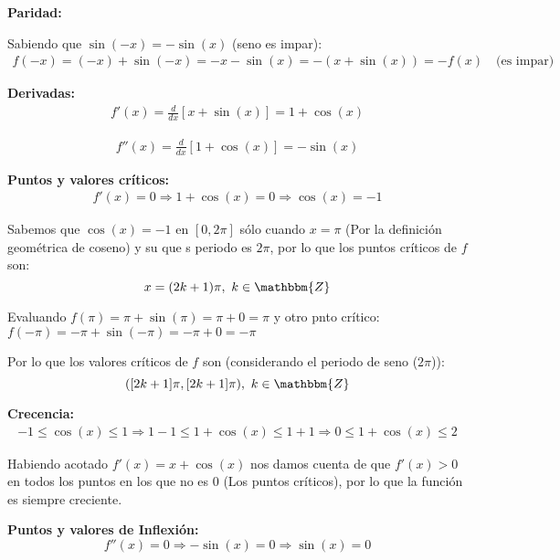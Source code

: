 \documentclass[12pt]{article}
\begin{document}
\begin{enumerate}[\hspace{9px} a)]
    \textbf{Paridad: }\medskip

        Sabiendo que \(\sin(-x)=-\sin(x)\) (seno es impar):
        \begin{align*}
            f(-x)=(-x)+\sin(-x)=-x-\sin(x)=-(x+\sin(x))=-f(x) \quad \text{(es impar)}
        \end{align*}

    \textbf{Derivadas: }
        \begin{align*}
            f'(x) = \frac{d}{dx}[x+\sin(x)] = 1+\cos(x)
        \end{align*}

        \begin{align*}
            f''(x) = \frac{d}{dx}[1+\cos(x)]=-\sin(x)        
        \end{align*}

    \textbf{Puntos y valores cr\'iticos: }
        \begin{align*}
            f'(x)=0 \Longrightarrow 1+\cos(x)=0 \Longrightarrow \cos(x)=-1
        \end{align*}

        Sabemos que \(\cos(x)=-1\) en \([0,2\pi]\) s\'olo cuando \(x=\pi\) (Por la definici\'on geom\'etrica de coseno) y su que s periodo es \(2\pi\), por lo que los puntos cr\'iticos de $f$ son:
        \[x=(2k+1)\pi, \ k\in\mathbbm{Z}\]

        Evaluando \(f(\pi)=\pi+\sin(\pi)=\pi+0=\pi\) y otro pnto cr\'itico: \(f(-\pi)=-\pi+\sin(-\pi)=-\pi+0=-\pi\)\medskip

        Por lo que los valores cr\'iticos de \(f\) son (considerando el periodo de seno (\(2\pi\))):
        \[([2k+1]\pi,[2k+1]\pi), \ k\in\mathbbm{Z}\]

    \textbf{Crecencia: }
        \begin{align*}
            -1\leq\cos(x)\leq1 \Longrightarrow 1-1\leq1+\cos(x)\leq1+1 \Longrightarrow 0\leq1+\cos(x)\leq2 
        \end{align*}

        Habiendo acotado \(f'(x)=x+\cos(x)\) nos damos cuenta de que \(f'(x)>0\) en todos los puntos en los que no es 0 (Los puntos cr\'iticos), por lo que la funci\'on es siempre creciente.\medskip

    \textbf{Puntos y valores de Inflexi\'on: }
        \begin{equation*}
            f''(x)=0 \Longrightarrow -\sin(x)=0 \Longrightarrow \sin(x)=0 
        \end{equation*}


\end{enumerate}
\end{document}
